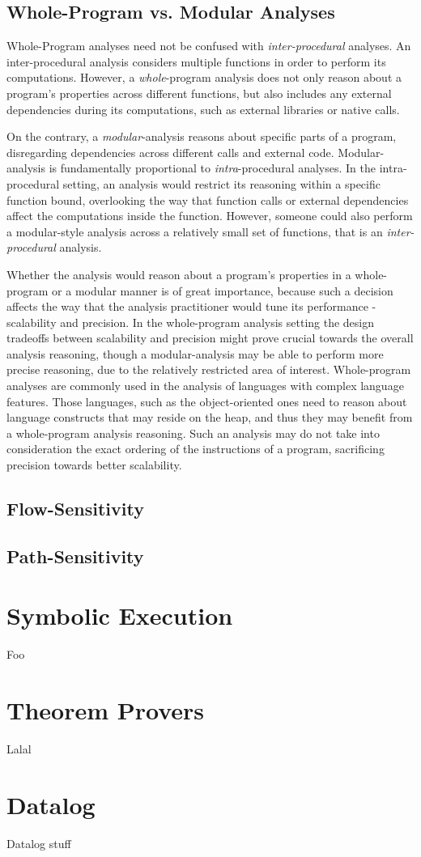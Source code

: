 \subsection{Whole-Program vs. Modular Analyses}

Whole-Program analyses need not be confused with \emph{inter-procedural} analyses. 
An inter-procedural analysis considers multiple functions in order to perform
its computations. However, a \emph{whole}-program analysis does not only reason
about a program's properties across different functions, but also includes any 
external dependencies during its computations, such as external libraries or 
native calls.

On the contrary, a \emph{modular}-analysis reasons about specific parts of a
program, disregarding dependencies across different calls and external code.
Modular-analysis is fundamentally proportional to \emph{intra}-procedural analyses.
In the intra-procedural setting, an analysis would restrict its reasoning within
a specific function bound, overlooking the way that function calls or external
dependencies affect the computations inside the function. However, someone could
also perform a modular-style analysis across a relatively small set of functions,
that is an \emph{inter-procedural} analysis.

Whether the analysis would reason about a program's properties in a whole-program
or a modular manner is of great importance, because such a decision affects the
way that the analysis practitioner would tune its performance - scalability and
precision. In the whole-program analysis setting the design tradeoffs between
scalability and precision might prove crucial towards the overall analysis
reasoning, though a modular-analysis may be able to perform more precise reasoning,
due to the relatively restricted area of interest. Whole-program analyses are
commonly used in the analysis of languages with complex language features. Those
languages, such as the object-oriented ones need to reason about language constructs
that may reside on the heap, and thus they may benefit from a whole-program analysis
reasoning. Such an analysis may do not take into consideration the
exact ordering of the instructions of a program, sacrificing precision towards
better scalability.

\subsection{Flow-Sensitivity}

\subsection{Path-Sensitivity}


\section{Symbolic Execution}
Foo

\section{Theorem Provers}
Lalal

\section{Datalog}
Datalog stuff
